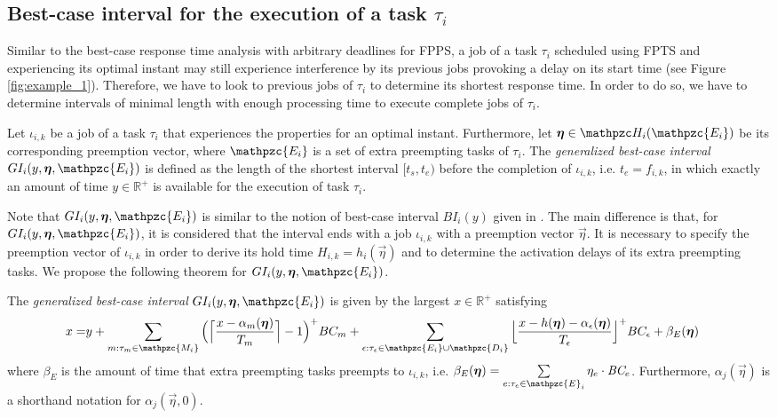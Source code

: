 \subsection{Best-case interval for the execution of a task $\tau_i$}

Similar to the best-case response time analysis with arbitrary deadlines for FPPS, a job of a task $\tau_i$ scheduled using FPTS and experiencing its optimal instant may still experience interference by its previous jobs provoking a delay on its start time (see Figure \ref{fig:example_1}). Therefore, we have to look to previous jobs of $\tau_i$ to determine its shortest response time. In order to do so,  we have to determine intervals of minimal length with enough processing time to execute complete jobs of $\tau_i$.

\begin{definition}\label{def:gen_best_interval}
	Let $\iota_{i,k}$ be a job of a task $\tau_i$ that experiences the properties for an optimal instant. Furthermore, let $\vec{\eta} \in \hlt_i(\mathpzc{E_i})$ be its corresponding preemption vector, where $\mathpzc{E_i}$ is a set of extra preempting tasks of $\tau_i$. The \textit{generalized best-case interval} $GI_i(y, \vec{\eta}, \mathpzc{E_i})$ is defined as the length of the shortest interval $[t_s,t_e)$ before the completion of $\iota_{i,k}$, i.e. $t_e = f_{i,k}$, in which exactly an amount of time $y \in \mathbb{R}^+$ is available for the execution of task $\tau_i$.
\end{definition}

Note that $GI_i(y, \vec{\eta},  \mathpzc{E_i})$ is similar to the notion of {best-case interval} $BI_i(y)$ given in \cite{BLM13}. The main difference is that, for $GI_i(y, \vec{\eta},  \mathpzc{E_i})$, it is considered that the interval ends with a job $\iota_{i,k}$ with a preemption vector $\vec{\eta}$. It is necessary to specify the preemption vector of $\iota_{i,k}$ in order to derive its hold time $H_{i,k}=h_i(\vec{\eta})$ and to determine the activation delays of its extra preempting tasks. We propose the following theorem for $GI_i(y, \vec{\eta},  \mathpzc{E_i})$.

\begin{theorem}
	The \textit{generalized best-case interval} $GI_i(y, \vec{\eta},  \mathpzc{E_i})$ is given by the largest $x \in \mathbb{R}^+$ satisfying
	\begin{align} \label{eq:g_best_interval}
	\begin{split}
	x = &y + \sum\limits_{m:\tau_m \in \mathpzc{M_i}} \Big( \Big\lceil  \dfrac{x-\alpha_m(\vec{\eta})}{T_m}\Big\rceil -1 \Big)^+  BC_m + \sum\limits_{\epsilon:\tau_{\epsilon} \in \mathpzc{E_i} \cup \mathpzc{D_i}} \Big\lfloor  \dfrac{x-h(\vec{\eta})-\alpha_\epsilon(\vec{\eta})}{T_\epsilon}\Big\rfloor^+  BC_\epsilon+ \beta_E(\vec{\eta})
	\end{split} 
		\end{align}
	where $\beta_E$ is the amount of time that extra preempting tasks preempts to $\iota_{i,k}$, i.e. $\beta_E(\vec{\eta}) = \sum\limits_{e:\tau_e \in \mathpzc{E}_i} \eta_e \cdot \bc_e$. Furthermore, $\alpha_j(\vec{\eta})$ is a shorthand notation for $\alpha_j(\vec{\eta},0)$.
\end{theorem}

